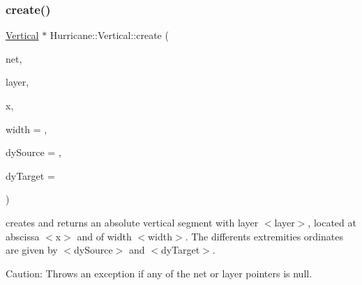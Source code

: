 \subsubsection{\texorpdfstring{create()}{create()}\hspace{0.1cm}{\footnotesize\ttfamily [1/2]}}
{\footnotesize\ttfamily \mbox{\hyperlink{classHurricane_1_1Vertical}{Vertical}} $\ast$ Hurricane\+::\+Vertical\+::create (\begin{DoxyParamCaption}\item[{\mbox{\hyperlink{classHurricane_1_1Net}{Net}} $\ast$}]{net,  }\item[{const \mbox{\hyperlink{classHurricane_1_1Layer}{Layer}} $\ast$}]{layer,  }\item[{const \mbox{\hyperlink{group__DbUGroup_ga4fbfa3e8c89347af76c9628ea06c4146}{Db\+U\+::\+Unit}} \&}]{x,  }\item[{const \mbox{\hyperlink{group__DbUGroup_ga4fbfa3e8c89347af76c9628ea06c4146}{Db\+U\+::\+Unit}} \&}]{width = {},  }\item[{const \mbox{\hyperlink{group__DbUGroup_ga4fbfa3e8c89347af76c9628ea06c4146}{Db\+U\+::\+Unit}} \&}]{dy\+Source = {},  }\item[{const \mbox{\hyperlink{group__DbUGroup_ga4fbfa3e8c89347af76c9628ea06c4146}{Db\+U\+::\+Unit}} \&}]{dy\+Target = {} }\end{DoxyParamCaption})\hspace{0.3cm}{\ttfamily [static]}}

creates and returns an absolute vertical segment with layer {\ttfamily $<$layer$>$}, located at abscissa {\ttfamily $<$x$>$} and of width {\ttfamily $<$width$>$}. The differents extremities ordinates are given by {\ttfamily $<$dy\+Source$>$} and {\ttfamily $<$dy\+Target$>$}.

\begin{DoxyParagraph}{Caution\+: Throws an exception if any of the net or layer pointers is }
null. 
\end{DoxyParagraph}
\mbox{\label{classHurricane_1_1Vertical_aabfa1b7d21d851f6f4c278bf2d7a2ff2}} 
